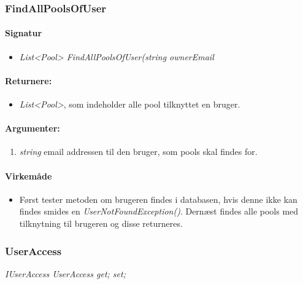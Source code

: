 \subsubsection{FindAllPoolsOfUser}%








\paragraph{Signatur}
\begin{itemize}
	\item \textit{List<Pool> FindAllPoolsOfUser(string ownerEmail}
\end{itemize}

\paragraph{Returnere:}
\begin{itemize}
	\item \textit{List<Pool>}, som indeholder alle pool tilknyttet en bruger.
\end{itemize}

\paragraph{Argumenter:}
\begin{enumerate}
	\item \textit{string} email addressen til den bruger, som pools skal findes for.
\end{enumerate}

\paragraph{Virkemåde}
\begin{itemize}
	\item Først tester metoden om brugeren findes i databasen, hvis denne ikke kan findes smides en \textit{UserNotFoundException()}. Dernæst findes alle pools med tilknytning til brugeren og disse returneres.
\end{itemize}






\subsubsection{UserAccess}%

\textit{IUserAccess UserAccess { get; set; }}
